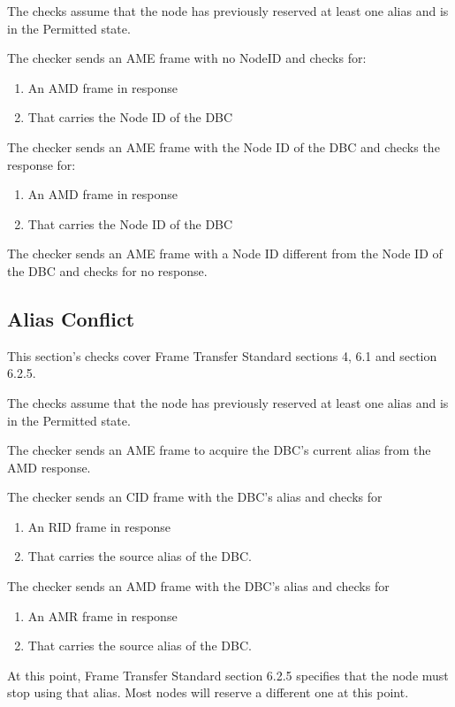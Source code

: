 \documentclass[11pt]{article}
\begin{document}
The checks assume that the node has previously reserved at least one alias
and is in the Permitted state.

The checker sends an AME frame with no NodeID and checks for:
\begin{enumerate}
\item An AMD frame in response
\item That carries the Node ID of the DBC
\end{enumerate}

The checker sends an AME frame with the Node ID of the DBC and checks the response for:
\begin{enumerate}
\item An AMD frame in response
\item That carries the Node ID of the DBC
\end{enumerate}

The checker sends an AME frame with a Node ID different from the Node ID of the DBC 
and checks for no response.


\subsection{Alias Conflict}

This section's checks cover Frame Transfer Standard sections 4, 6.1 and section 6.2.5.

The checks assume that the node has previously reserved at least one alias
and is in the Permitted state.

The checker sends an AME frame to acquire the DBC's current alias from the AMD
response.

The checker sends an CID frame with the DBC's alias and checks for
\begin{enumerate}
\item An RID frame in response
\item That carries the source alias of the DBC.
\end{enumerate}

The checker sends an AMD frame with the DBC's alias and checks for
\begin{enumerate}
\item An AMR frame in response
\item That carries the source alias of the DBC.
\end{enumerate}

At this point, Frame Transfer Standard section 6.2.5 specifies that the node must stop
using that alias.  Most nodes will reserve a different one at this point.
\end{document}
